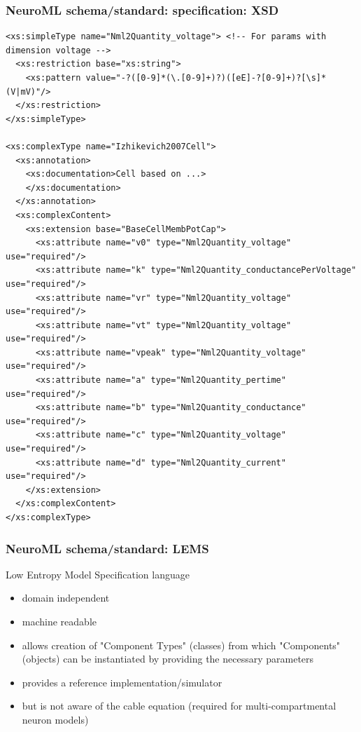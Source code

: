 \begin{frame}[fragile,c]
  \frametitle{NeuroML schema/standard: specification: XSD}
  \begin{center}
    \begin{verbatim}
<xs:simpleType name="Nml2Quantity_voltage"> <!-- For params with dimension voltage -->
  <xs:restriction base="xs:string">
    <xs:pattern value="-?([0-9]*(\.[0-9]+)?)([eE]-?[0-9]+)?[\s]*(V|mV)"/>
  </xs:restriction>
</xs:simpleType>

<xs:complexType name="Izhikevich2007Cell">
  <xs:annotation>
    <xs:documentation>Cell based on ...>
    </xs:documentation>
  </xs:annotation>
  <xs:complexContent>
    <xs:extension base="BaseCellMembPotCap">
      <xs:attribute name="v0" type="Nml2Quantity_voltage" use="required"/>
      <xs:attribute name="k" type="Nml2Quantity_conductancePerVoltage" use="required"/>
      <xs:attribute name="vr" type="Nml2Quantity_voltage" use="required"/>
      <xs:attribute name="vt" type="Nml2Quantity_voltage" use="required"/>
      <xs:attribute name="vpeak" type="Nml2Quantity_voltage" use="required"/>
      <xs:attribute name="a" type="Nml2Quantity_pertime" use="required"/>
      <xs:attribute name="b" type="Nml2Quantity_conductance" use="required"/>
      <xs:attribute name="c" type="Nml2Quantity_voltage" use="required"/>
      <xs:attribute name="d" type="Nml2Quantity_current" use="required"/>
    </xs:extension>
  </xs:complexContent>
</xs:complexType>
    \end{verbatim}
  \end{center}
\end{frame}
\begin{frame}[t]
  \frametitle{NeuroML schema/standard: LEMS}
    Low Entropy Model Specification language
    \begin{itemize}
      \item domain independent
      \item machine readable
      \item allows creation of "Component Types" \alert{(classes)} from which "Components" \alert{(objects)} can be instantiated by providing the necessary parameters
      \item provides a reference implementation/simulator
        \pause{}
      \item but is not aware of the cable equation (required for multi-compartmental neuron models)
    \end{itemize}
\end{frame}
